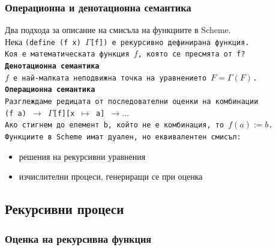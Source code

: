 \documentclass[alsotrans]{beamerswitch}
\begin{document}
\begin{frame}
  \frametitle{Операционна и денотационна семантика}

  Два подхода за описание на смисъла на функциите в Scheme.\\
  \pause
  Нека \tt{(define (f x) $\Gamma$[f])} е рекурсивно дефинирана функция.\\
  \pause
  \alert{Коя е математическата функция $f$, която се пресмята от \tt f?}\\[2ex]
  \pause
  \textbf{Денотационна семантика}\\
  $f$ е най-малката неподвижна точка на уравнението $F = \Gamma(F)$.\\[2ex]
  \pause
  \textbf{Операционна семантика}\\
  Разглеждаме редицата от последователни оценки на комбинации\\
  \tt{(f a)} $\rightarrow$ \tt{$\Gamma$[f][x $\mapsto$ a]} $\rightarrow\ldots$\\
  Ако стигнем до елемент \tt b, който не е комбинация, то $f(a) := b$.\\[2ex]
  \pause
  \alert{Функциите в Scheme имат дуален, но еквивалентен смисъл:}
  \begin{itemize}
  \item решения на рекурсивни уравнения
  \item изчислителни процеси, генериращи се при оценка
  \end{itemize}
\end{frame}

\subsection{Рекурсивни процеси}

\begin{frame}
  \frametitle{Оценка на рекурсивна функция}

  \begin{center}
    \scriptsize\lstscriptsize
  \end{center}
\end{frame}
\end{document}
